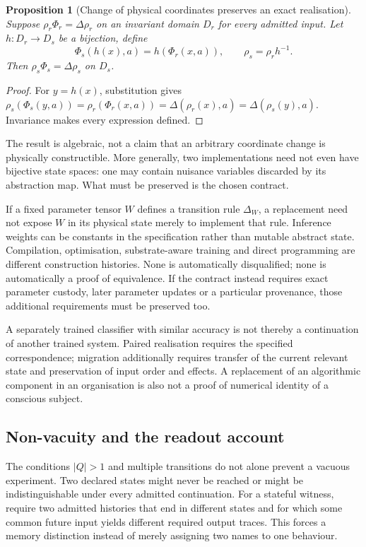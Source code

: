 \documentclass[11pt,a4paper]{article}
\newtheorem{proposition}[theorem]{Proposition}
\theoremstyle{definition}
\theoremstyle{remark}
\begin{document}
\begin{proposition}[Change of physical coordinates preserves an exact realisation]\label{prop:coordinates}
Suppose $\rho_r\Phi_r=\Delta\rho_r$ on an invariant domain $D_r$ for every admitted input. Let $h:D_r\to D_s$ be a bijection, define
\[
 \Phi_s(h(x),a)=h(\Phi_r(x,a)),\qquad \rho_s=\rho_r h^{-1}.
\]
Then $\rho_s\Phi_s=\Delta\rho_s$ on $D_s$.
\end{proposition}
\begin{proof}
For $y=h(x)$, substitution gives
$\rho_s(\Phi_s(y,a))=\rho_r(\Phi_r(x,a))=\Delta(\rho_r(x),a)=\Delta(\rho_s(y),a)$.
Invariance makes every expression defined.
\end{proof}
The result is algebraic, not a claim that an arbitrary coordinate change is physically constructible. More generally, two implementations need not even have bijective state spaces: one may contain nuisance variables discarded by its abstraction map. What must be preserved is the chosen contract.

If a fixed parameter tensor $W$ defines a transition rule $\Delta_W$, a replacement need not expose $W$ in its physical state merely to implement that rule. Inference weights can be constants in the specification rather than mutable abstract state. Compilation, optimisation, substrate-aware training and direct programming are different construction histories. None is automatically disqualified; none is automatically a proof of equivalence. If the contract instead requires exact parameter custody, later parameter updates or a particular provenance, those additional requirements must be preserved too.

A separately trained classifier with similar accuracy is not thereby a continuation of another trained system. Paired realisation requires the specified correspondence; migration additionally requires transfer of the current relevant state and preservation of input order and effects. A replacement of an algorithmic component in an organisation is also not a proof of numerical identity of a conscious subject.

\subsection{Non-vacuity and the readout account}\label{subsec:nonvacuity}
The conditions $|Q|>1$ and multiple transitions do not alone prevent a vacuous experiment. Two declared states might never be reached or might be indistinguishable under every admitted continuation. For a stateful witness, require two admitted histories that end in different states and for which some common future input yields different required output traces. This forces a memory distinction instead of merely assigning two names to one behaviour.
\end{document}

